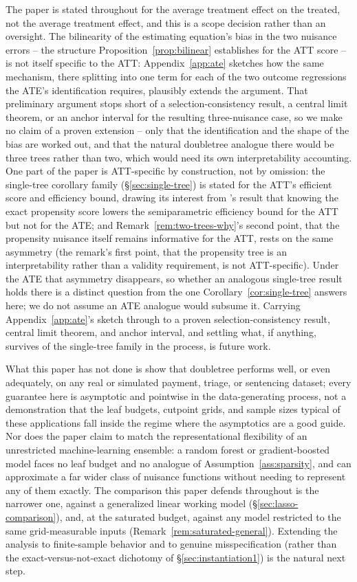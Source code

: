 \documentclass[12pt]{article}
\begin{document}
The paper is stated throughout for the average treatment effect on the treated, not the average treatment effect, and this is a scope decision rather than an oversight. The bilinearity of the estimating equation's bias in the two nuisance errors -- the structure Proposition~\ref{prop:bilinear} establishes for the ATT score -- is not itself specific to the ATT: Appendix~\ref{app:ate} sketches how the same mechanism, there splitting into one term for each of the two outcome regressions the ATE's identification requires, plausibly extends the argument. That preliminary argument stops short of a selection-consistency result, a central limit theorem, or an anchor interval for the resulting three-nuisance case, so we make no claim of a proven extension -- only that the identification and the shape of the bias are worked out, and that the natural doubletree analogue there would be three trees rather than two, which would need its own interpretability accounting. One part of the paper is ATT-specific by construction, not by omission: the single-tree corollary family (\S\ref{sec:single-tree}) is stated for the ATT's efficient score and efficiency bound, drawing its interest from \citet{hahn1998}'s result that knowing the exact propensity score lowers the semiparametric efficiency bound for the ATT but not for the ATE; and Remark~\ref{rem:two-trees-why}'s second point, that the propensity nuisance itself remains informative for the ATT, rests on the same asymmetry (the remark's first point, that the propensity tree is an interpretability rather than a validity requirement, is not ATT-specific). Under the ATE that asymmetry disappears, so whether an analogous single-tree result holds there is a distinct question from the one Corollary~\ref{cor:single-tree} answers here; we do not assume an ATE analogue would subsume it. Carrying Appendix~\ref{app:ate}'s sketch through to a proven selection-consistency result, central limit theorem, and anchor interval, and settling what, if anything, survives of the single-tree family in the process, is future work.

What this paper has not done is show that doubletree performs well, or even adequately, on any real or simulated payment, triage, or sentencing dataset; every guarantee here is asymptotic and pointwise in the data-generating process, not a demonstration that the leaf budgets, cutpoint grids, and sample sizes typical of these applications fall inside the regime where the asymptotics are a good guide. Nor does the paper claim to match the representational flexibility of an unrestricted machine-learning ensemble: a random forest or gradient-boosted model faces no leaf budget and no analogue of Assumption~\ref{ass:sparsity}, and can approximate a far wider class of nuisance functions without needing to represent any of them exactly. The comparison this paper defends throughout is the narrower one, against a generalized linear working model (\S\ref{sec:lasso-comparison}), and, at the saturated budget, against any model restricted to the same grid-measurable inputs (Remark~\ref{rem:saturated-general}). Extending the analysis to finite-sample behavior and to genuine misspecification (rather than the exact-versus-not-exact dichotomy of \S\ref{sec:instantiation1}) is the natural next step.
\end{document}
